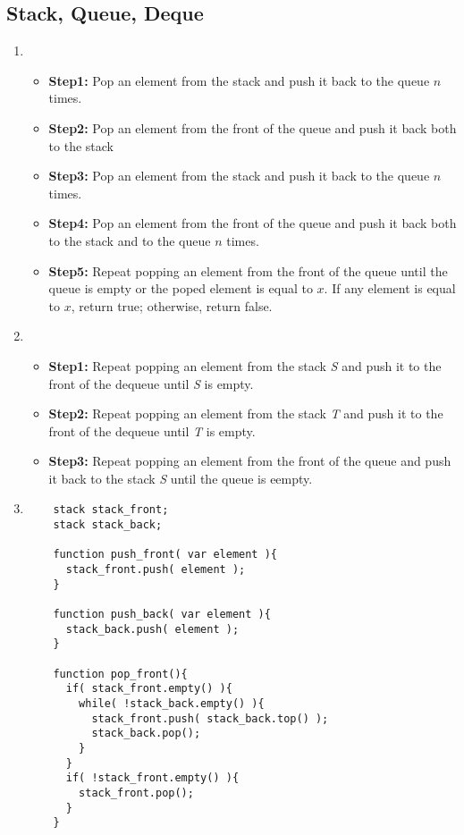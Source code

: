\documentclass[fleqn,a4paper,12pt]{article}
\begin{document}
\subsection{Stack, Queue, Deque}
\begin{enumerate}
\item
  \begin{itemize}
  \item 
    \textbf{Step1: }Pop an element from the stack and push it back to the queue $n$ times.
  \item
    \textbf{Step2: }Pop an element from the front of the queue and push it back both to the stack
  \item
    \textbf{Step3: }Pop an element from the stack and push it back to the queue $n$ times.
  \item
    \textbf{Step4: }Pop an element from the front of the queue and push it back both to the stack and to the queue $n$ times. 
  \item
    \textbf{Step5: }Repeat popping an element from the front of the queue until the queue is empty or the poped element is equal to $x$. If any element is equal to $x$, return true; otherwise, return false.
  \end{itemize}

\item
  \begin{itemize}
  \item 
    \textbf{Step1: }Repeat popping an element from the stack \textit{S} and push it to the front of the dequeue until \textit{S} is empty.
  \item
    \textbf{Step2: }Repeat popping an element from the stack \textit{T} and push it to the front of the dequeue until \textit{T} is empty.
  \item
    \textbf{Step3: }Repeat popping an element from the front of the queue and push it back to the stack \textit{S} until the queue is eempty.
  \end{itemize}
  
\item
  \begin{lstlisting}
    stack stack_front;
    stack stack_back;

    function push_front( var element ){
      stack_front.push( element );
    }

    function push_back( var element ){
      stack_back.push( element );
    }

    function pop_front(){
      if( stack_front.empty() ){
        while( !stack_back.empty() ){
          stack_front.push( stack_back.top() );
          stack_back.pop();
        }
      }
      if( !stack_front.empty() ){
        stack_front.pop();
      }
    }


\end{lstlisting}
\end{enumerate}
\end{document}
